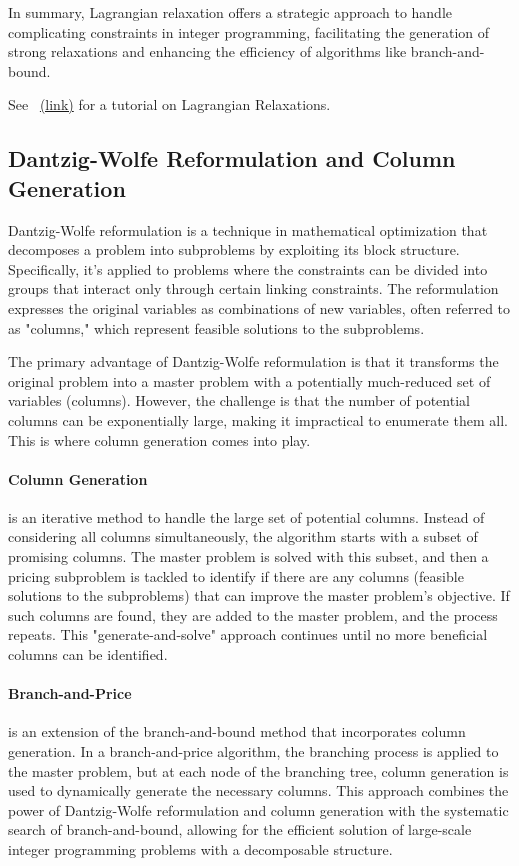 In summary, Lagrangian relaxation offers a strategic approach to handle complicating constraints in integer programming, facilitating the generation of strong relaxations and enhancing the efficiency of algorithms like branch-and-bound.

See~\cite{Fisher2004}  \href{https://my.eng.utah.edu/~kalla/phy_des/lagrange-relax-tutorial-fisher.pdf}{(link)} for a tutorial on Lagrangian Relaxations.

\subsection{Dantzig-Wolfe Reformulation and Column Generation}

Dantzig-Wolfe reformulation is a technique in mathematical optimization that decomposes a problem into subproblems by exploiting its block structure. Specifically, it's applied to problems where the constraints can be divided into groups that interact only through certain linking constraints. The reformulation expresses the original variables as combinations of new variables, often referred to as "columns," which represent feasible solutions to the subproblems.

The primary advantage of Dantzig-Wolfe reformulation is that it transforms the original problem into a master problem with a potentially much-reduced set of variables (columns). However, the challenge is that the number of potential columns can be exponentially large, making it impractical to enumerate them all. This is where column generation comes into play.

\paragraph{Column Generation} is an iterative method to handle the large set of potential columns. Instead of considering all columns simultaneously, the algorithm starts with a subset of promising columns. The master problem is solved with this subset, and then a pricing subproblem is tackled to identify if there are any columns (feasible solutions to the subproblems) that can improve the master problem's objective. If such columns are found, they are added to the master problem, and the process repeats. This "generate-and-solve" approach continues until no more beneficial columns can be identified.

\paragraph{Branch-and-Price} is an extension of the branch-and-bound method that incorporates column generation. In a branch-and-price algorithm, the branching process is applied to the master problem, but at each node of the branching tree, column generation is used to dynamically generate the necessary columns. This approach combines the power of Dantzig-Wolfe reformulation and column generation with the systematic search of branch-and-bound, allowing for the efficient solution of large-scale integer programming problems with a decomposable structure.

